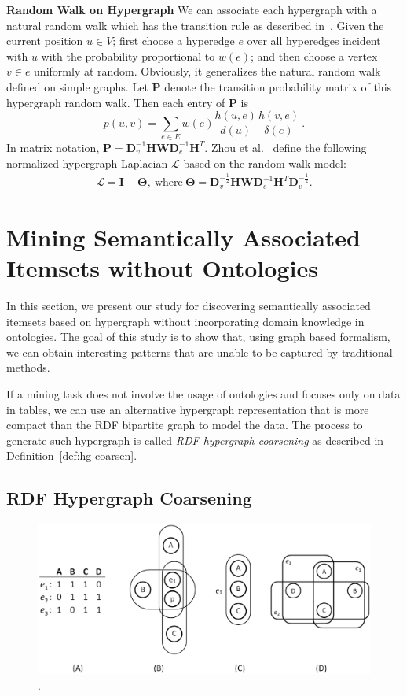 \textbf{Random Walk on Hypergraph}
\label{sec:rw_hyper}
We can associate each hypergraph with a natural random walk which has the transition rule as
described in~\cite{Zhou06learningwith}. Given the current position $u \in V$; first choose a hyperedge $e$ over all hyperedges
incident with $u$ with the probability proportional to $w(e)$; and then choose a vertex $v \in e$
uniformly at random. Obviously, it generalizes the natural random walk defined on simple
graphs. Let $\mathbf{P}$ denote the transition probability matrix of this hypergraph random walk.
Then each entry of $\mathbf{P}$ is
\[
p(u,v) = \sum_{e\in E}{w(e)\frac{h(u,e)}{d(u)}\frac{h(v,e)}{\delta(e)}}\, .
\]
In matrix notation, $\mathbf{P}=\mathbf{D}_v^{-1}\mathbf{HWD}_e^{-1}\mathbf{H}^T$.
Zhou et al.~\cite{Zhou06learningwith} define the following normalized hypergraph Laplacian $\mathcal{L}$ based on the random walk model:
\begin{align}
\mathcal{L}=\mathbf{I}-\mathbf{\Theta},   ~\mathrm{where}~ \mathbf{\Theta}=\mathbf{D}_v^{-\frac12}\mathbf{HWD}_e^{-1}\mathbf{H}^T\mathbf{D}_v^{-\frac12} \label{eq:normalizedHyperL}.
\end{align}

\section{Mining Semantically Associated Itemsets without Ontologies}
In this section, we present our study for discovering semantically associated itemsets based on hypergraph without incorporating domain knowledge in ontologies. The goal of this study is to show that, using graph based formalism, we can obtain interesting patterns that are unable to be captured by traditional methods. 

If a mining task does not involve the usage of ontologies and focuses only on data in tables, we can use an alternative hypergraph representation that is more compact than the RDF bipartite graph to model the data. The process to generate such hypergraph is called \emph{RDF hypergraph coarsening} as described in Definition~\ref{def:hg-coarsen}.

\subsection{RDF Hypergraph Coarsening}

\begin{figure}[tbh]
\centering
\includegraphics[width=\textwidth]{fig/hypergraph-coarsening.eps}
\caption{\label{fig:hypergraph-coarsening} .}
\end{figure}

